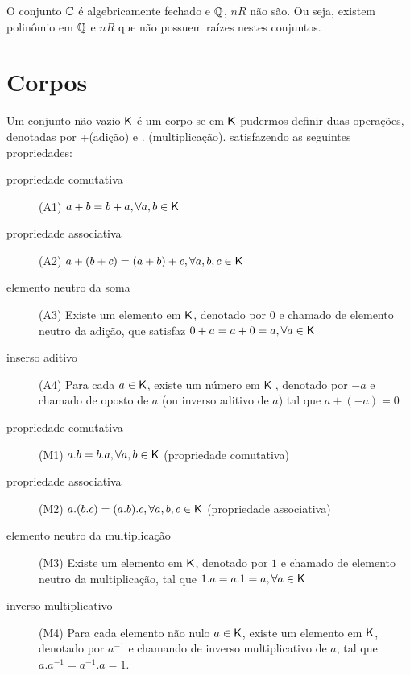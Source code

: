 \documentclass[10pt,a4paper]{book}
\begin{document}
\begin{remark}
	O conjunto $\mathbb{ C }$ é algebricamente fechado e $\mathbb{ Q }$, $nR$ não são. Ou seja, existem polinômio em $\mathbb{ Q }$ e $nR$ que não possuem raízes nestes conjuntos.
\end{remark}

\section{Corpos}
\begin{definition}
	Um conjunto não vazio $\mathsf{ K }$ é um corpo se em $\mathsf{ K }$ pudermos definir duas operações, denotadas por +(adição) e . (multiplicação). satisfazendo as seguintes propriedades:
	\begin{description}
		\item[propriedade comutativa] (A1) $a + b = b + a, \forall a, b \in \mathsf{ K }$ 
		\item[propriedade associativa] (A2) $a + (b + c) = (a + b) + c, \forall a, b, c \in \mathsf{ K }$ 
		\item[elemento neutro da soma] (A3) Existe um elemento em $\mathsf{ K }$, denotado por $0$ e chamado de elemento neutro da adição, que satisfaz $0 + a = a + 0 = a, \forall a \in \mathsf{ K }$
		\item[inserso aditivo] (A4) Para cada $a \in \mathsf{ K }$, existe um número em $\textsf{K}$ , denotado por $-a$ e chamado de oposto de $a$ (ou inverso aditivo de $a$) tal que $a + (-a) = 0$
		\item[propriedade comutativa] (M1) $a.b = b.a, \forall a, b \in \mathsf{ K }$ (propriedade comutativa)
		\item[propriedade associativa] (M2) $a.(b.c) = (a.b).c, \forall a, b, c \in \mathsf{ K }$ (propriedade associativa)
		\item[elemento neutro da multiplicação] (M3) Existe um elemento em $\mathsf{ K }$, denotado por $1$ e chamado de elemento neutro da multiplicação, tal que $1.a = a.1 = a, \forall a \in \mathsf{ K }$
		\item[inverso multiplicativo] (M4) Para cada elemento não nulo $a \in \mathsf{ K }$, existe um elemento em $\mathsf{ K }$, denotado por $a^{-1}$ e chamando de inverso multiplicativo  de $a$, tal que $a.a^{-1} = a^{-1}.a = 1$.
	\end{description}
\end{definition}




\end{document}
